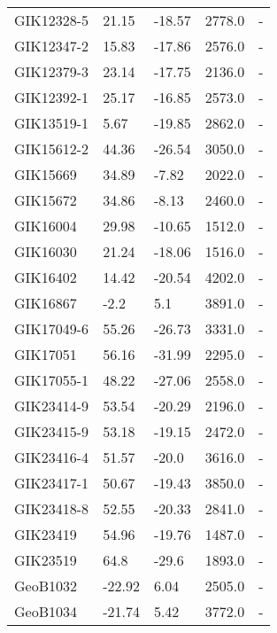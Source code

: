 \begin{longtable}{lllrl}
       GIK12328-5 &    21.15 &    -18.57 &     2778.0 &         - \\
       GIK12347-2 &    15.83 &    -17.86 &     2576.0 &         - \\
       GIK12379-3 &    23.14 &    -17.75 &     2136.0 &         - \\
       GIK12392-1 &    25.17 &    -16.85 &     2573.0 &         - \\
       GIK13519-1 &     5.67 &    -19.85 &     2862.0 &         - \\
       GIK15612-2 &    44.36 &    -26.54 &     3050.0 &         - \\
         GIK15669 &    34.89 &     -7.82 &     2022.0 &         - \\
         GIK15672 &    34.86 &     -8.13 &     2460.0 &         - \\
         GIK16004 &    29.98 &    -10.65 &     1512.0 &         - \\
         GIK16030 &    21.24 &    -18.06 &     1516.0 &         - \\
         GIK16402 &    14.42 &    -20.54 &     4202.0 &         - \\
         GIK16867 &     -2.2 &       5.1 &     3891.0 &         - \\
       GIK17049-6 &    55.26 &    -26.73 &     3331.0 &         - \\
         GIK17051 &    56.16 &    -31.99 &     2295.0 &         - \\
       GIK17055-1 &    48.22 &    -27.06 &     2558.0 &         - \\
       GIK23414-9 &    53.54 &    -20.29 &     2196.0 &         - \\
       GIK23415-9 &    53.18 &    -19.15 &     2472.0 &         - \\
       GIK23416-4 &    51.57 &     -20.0 &     3616.0 &         - \\
       GIK23417-1 &    50.67 &    -19.43 &     3850.0 &         - \\
       GIK23418-8 &    52.55 &    -20.33 &     2841.0 &         - \\
         GIK23419 &    54.96 &    -19.76 &     1487.0 &         - \\
         GIK23519 &     64.8 &     -29.6 &     1893.0 &         - \\
         GeoB1032 &   -22.92 &      6.04 &     2505.0 &         - \\
         GeoB1034 &   -21.74 &      5.42 &     3772.0 &         - \\

\end{longtable}
